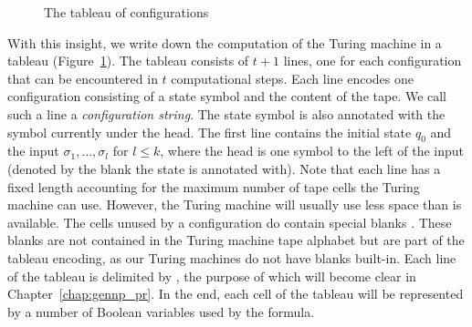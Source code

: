 \begin{figure}
\begin{center}
  \end{center}
  \caption{The tableau of configurations}\label{fig:tableau}
\end{figure}

With this insight, we write down the computation of the Turing machine in a tableau (Figure~\ref{fig:tableau}).
The tableau consists of $t+1$ lines, one for each configuration that can be encountered in $t$ computational steps. Each line encodes one configuration consisting of a state symbol and the content of the tape. We call such a line a \emph{configuration string}. The state symbol is also annotated with the symbol currently under the head.
The first line contains the initial state $q_0$ and the input $\sigma_1, \ldots, \sigma_l$ for $l \le k$, where the head is one symbol to the left of the input (denoted by the blank the state is annotated with).
Note that each line has a fixed length accounting for the maximum number of tape cells the Turing machine can use. However, the Turing machine will usually use less space than is available. The cells unused by a configuration do contain special blanks \blank.
These blanks are not contained in the Turing machine tape alphabet but are part of the tableau encoding, as our Turing machines do not have blanks built-in.
Each line of the tableau is delimited by \delim, the purpose of which will become clear in Chapter~\ref{chap:gennp_pr}.
In the end, each cell of the tableau will be represented by a number of Boolean variables used by the \SAT{} formula.

